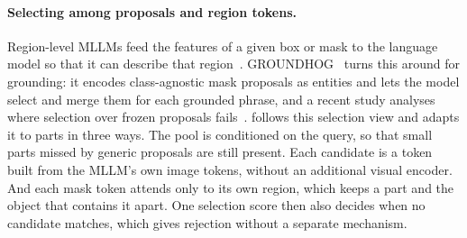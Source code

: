 \paragraph{Selecting among proposals and region tokens.}
Region-level MLLMs feed the features of a given box or mask to the language model so that it can describe that
region~\cite{you2024ferret,yuan2024osprey,lian2025describe}. GROUNDHOG~\cite{zhang2024groundhog} turns this
around for grounding: it encodes class-agnostic mask proposals as entities and lets the model select and merge
them for each grounded phrase, and a recent study analyses where selection over frozen proposals
fails~\cite{ma2026does}. \ours{} follows this selection view and adapts it to parts in three ways. The pool is
conditioned on the query, so that small parts missed by generic proposals are still present. Each candidate is a
token built from the MLLM's own image tokens, without an additional visual encoder. And each mask token attends
only to its own region, which keeps a part and the object that contains it apart. One selection score then also
decides when no candidate matches, which gives rejection without a separate mechanism.
